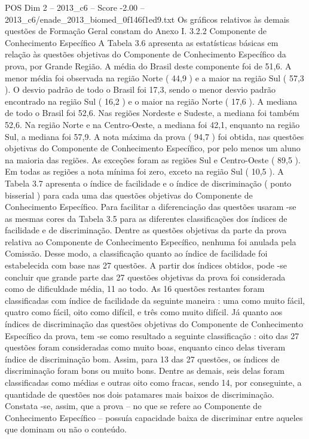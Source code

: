 \begin{textsample}{POS Dim 2 – 2013\_c6 – Score -2.00 – 2013\_c6/enade\_2013\_biomed\_0f146f1ed9.txt}
Os gráficos relativos às demais questões de Formação Geral constam do Anexo I. 3.2.2 Componente de Conhecimento Específico A Tabela 3.6 apresenta as estatísticas básicas em relação às questões objetivas do Componente de Conhecimento Específico da prova, por Grande Região.
A média do Brasil deste componente foi de 51,6.
A menor média foi observada na região Norte ( 44,9 ) e a maior na região Sul ( 57,3 ).
O desvio padrão de todo o Brasil foi 17,3, sendo o menor desvio padrão encontrado na região Sul ( 16,2 ) e o maior na região Norte ( 17,6 ).
A mediana de todo o Brasil foi 52,6.
Nas regiões Nordeste e Sudeste, a mediana foi também 52,6.
Na região Norte e na Centro-Oeste, a mediana foi 42,1, enquanto na região Sul, a mediana foi 57,9.
A nota máxima da prova ( 94,7 ) foi obtida, nas questões objetivas do Componente de Conhecimento Específico, por pelo menos um aluno na maioria das regiões.
As exceções foram as regiões Sul e Centro-Oeste ( 89,5 ).
Em todas as regiões a nota mínima foi zero, exceto na região Sul ( 10,5 ).
A Tabela 3.7 apresenta o índice de facilidade e o índice de discriminação ( ponto bisserial ) para cada uma das questões objetivas do Componente de Conhecimento Específico.
Para facilitar a diferenciação das questões usaram -se as mesmas cores da Tabela 3.5 para as diferentes classificações dos índices de facilidade e de discriminação.
Dentre as questões objetivas da parte da prova relativa ao Componente de Conhecimento Específico, nenhuma foi anulada pela Comissão.
Desse modo, a classificação quanto ao índice de facilidade foi estabelecida com base nas 27 questões.
A partir dos índices obtidos, pode -se concluir que grande parte das 27 questões objetivas da prova foi considerada como de dificuldade média, 11 ao todo.
As 16 questões restantes foram classificadas com índice de facilidade da seguinte maneira : uma como muito fácil, quatro como fácil, oito como difícil, e três como muito difícil.
Já quanto aos índices de discriminação das questões objetivas do Componente de Conhecimento Específico da prova, tem -se como resultado a seguinte classificação : oito das 27 questões foram consideradas como muito boas, enquanto cinco delas tiveram índice de discriminação bom.
Assim, para 13 das 27 questões, os índices de discriminação foram bons ou muito bons.
Dentre as demais, seis delas foram classificadas como médias e outras oito como fracas, sendo 14, por conseguinte, a quantidade de questões nos dois patamares mais baixos de discriminação.
Constata -se, assim, que a prova – no que se refere ao Componente de Conhecimento Específico – possuía capacidade baixa de discriminar entre aqueles que dominam ou não o conteúdo.

\end{textsample}
